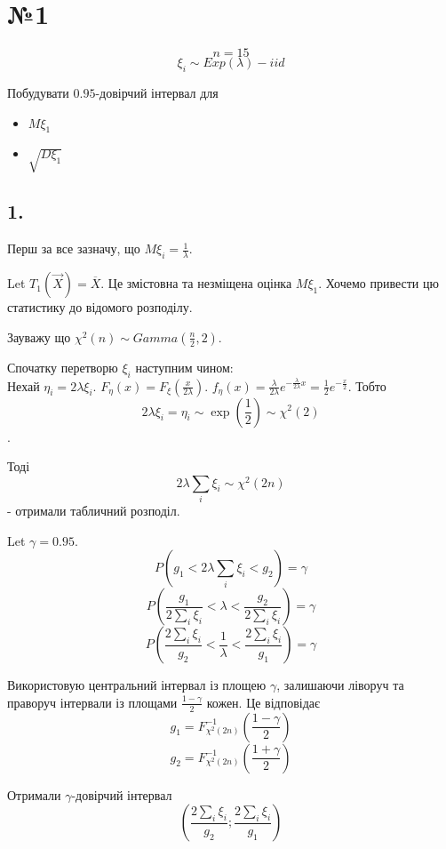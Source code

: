 \documentclass[11pt, a4paper]{article} %
\begin{document}
\section*{№1}
\begin{mdframed}
    $$n = 15$$
    $$\xi_i \sim Exp(\lambda) - iid$$

    Побудувати $0.95$-довірчий інтервал для 
    \begin{itemize}
        \item $M\xi_1$
        \item $\sqrt{D\xi_1}$
    \end{itemize}
\end{mdframed}

\subsection*{1.}

Перш за все зазначу, що $M\xi_i = \frac{1}{\lambda}$.

Let $T_1(\vec X) = \overline X$. Це змістовна та незміщена оцінка $M\xi_1$.
Хочемо привести цю статистику до відомого розподілу.

Зауважу що $\chi^2(n) \sim Gamma(\frac{n}{2}, 2)$.

Спочатку перетворю $\xi_i$ наступним чином:\\
Нехай $\eta_i = 2\lambda\xi_i$.
$F_\eta(x) = F_\xi(\frac{x}{2\lambda})$.
$f_\eta(x) = \frac{\lambda}{2\lambda} e^{-\frac{\lambda}{2\lambda}x} = \frac{1}{2}e^{-\frac{x}{2}}$.
Тобто 
$$2\lambda\xi_i = \eta_i \sim \exp(\frac{1}{2}) \sim \chi^2(2)$$.

Тоді 
$$2 \lambda \sum_i \xi_i \sim \chi^2(2n)$$ 
- отримали табличний розподіл.

Let $\gamma = 0.95$.
$$P\left(g_1 < 2 \lambda \sum_i \xi_i < g_2\right) = \gamma$$
$$P\left(\frac{g_1}{2\sum_i \xi_i} <  \lambda  < \frac{g_2}{2\sum_i \xi_i}\right) = \gamma$$
$$P\left(\frac{2\sum_i \xi_i}{g_2} <  \frac{1}{\lambda}  < \frac{2\sum_i \xi_i}{g_1}\right) = \gamma$$

Використовую центральний інтервал із площею $\gamma$, залишаючи ліворуч та праворуч 
інтервали із площами $\frac{1-\gamma}{2}$ кожен. 
Це відповідає
$$g_1 = F^{-1}_{\chi^2(2n)}\left(\frac{1-\gamma}{2}\right)$$ 
$$g_2 = F^{-1}_{\chi^2(2n)}\left(\frac{1+\gamma}{2}\right)$$ 

Отримали $\gamma$-довірчий інтервал 
$$\left(\frac{2\sum_i \xi_i}{g_2} ; \frac{2\sum_i \xi_i}{g_1}\right)$$
\end{document}
